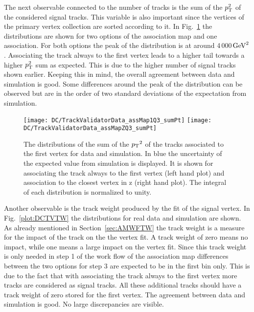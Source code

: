 The next observable connected to the number of tracks is the sum of the $p_{\mathrm{T}}^{2}$ of the considered signal tracks. This variable is also important since the vertices of the primary vertex collection are sorted according to it. In Fig.~\ref{plot:DCTVSumPt} the distributions are shown for two options of the association map and one association. For both options the peak of the distribution is at around 4\,000$\,\text{Ge\hspace{-.08em}V}^{2}$. Associating the track always to the first vertex leads to a higher tail towards a higher $p_{\mathrm{T}}^{2}$ sum as expected. This is due to the higher number of signal tracks shown earlier. Keeping this in mind, the overall agreement between data and simulation is good. Some differences around the peak of the distribution can be observed but are in the order of two standard deviations of the expectation from simulation.

\begin{figure}[h!t]
  \centering
  \texttt{[image: DC/TrackValidatorData\_assMap1Q3\_sumPt]}
  \texttt{[image: DC/TrackValidatorData\_assMapZQ3\_sumPt]}
  \caption[Distributions for the first vertex $\pt{}^{2}$ for data and simulation for two options of the association map]{The distributions of the sum of the $\pt{}^{2}$ of the tracks associated to the first vertex for data and simulation. In blue the uncertainty of the expected value from simulation is displayed. It is shown for associating the track always to the first vertex (left hand plot) and association to the closest vertex in z (right hand plot). The integral of each distribution is normalized to unity. \label{plot:DCTVSumPt}}
\end{figure}

Another observable is the track weight produced by the fit of the signal vertex. In Fig.~\ref{plot:DCTVTW} the distributions for real data and simulation are shown. As already mentioned in Section~\ref{sec:AMWFTW} the track weight is a measure for the impact of the track on the the vertex fit. A track weight of zero means no impact, while one means a large impact on the vertex fit. Since this track weight is only needed in step 1 of the work flow of the association map differences between the two options for step 3 are expected to be in the first bin only. This is due to the fact that with associating the track always to the first vertex more tracks are considered as signal tracks. All these additional tracks should have a track weight of zero stored for the first vertex. The agreement between data and simulation is good. No large discrepancies are visible.


